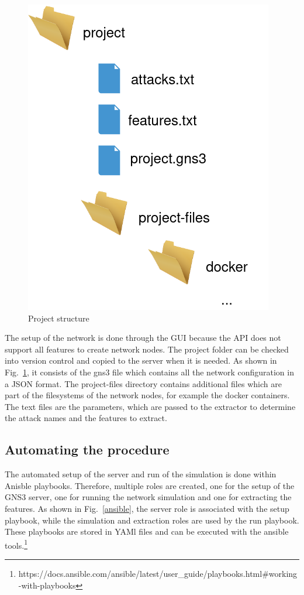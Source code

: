 \documentclass[conference]{IEEEtran}
\begin{document}
\begin{figure}[htbp]
\centerline{\includegraphics[scale=0.33]{project.png}}
\caption{Project structure}
\label{project}
\end{figure}

The setup of the network is done through the GUI because the API does not support all features to create network nodes. The project folder can be checked into version control and copied to the server when it is needed. As shown in Fig.~\ref{project}, it consists of the gns3 file which contains all the network configuration in a JSON format. The project-files directory contains additional files which are part of the filesystems of the network nodes, for example the docker containers. The text files are the parameters, which are passed to the extractor to determine the attack names and the features to extract.

\subsection{Automating the procedure}

The automated setup of the server and run of the simulation is done within Anisble playbooks. Therefore, multiple roles are created, one for the setup of the GNS3 server, one for running the network simulation and one for extracting the features. As shown in Fig.~\ref{ansible}, the server role is associated with the setup playbook, while the simulation and extraction roles are used by the run playbook. These playbooks are stored in YAMl files and can be executed with the ansible tools.\footnote{https://docs.ansible.com/ansible/latest/user\_guide/playbooks.html\#working-with-playbooks}  
\end{document}
